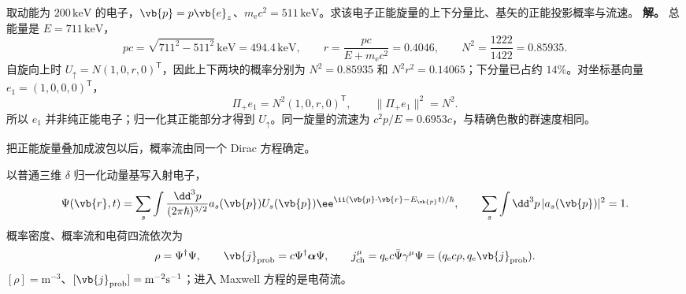 \begin{exbox}
取动能为 $200\,\mathrm{keV}$ 的电子，$\vb{p}=p\vb{e}_z$、$m_{\mathrm e}c^2=511\,\mathrm{keV}$。求该电子正能旋量的上下分量比、基矢的正能投影概率与流速。
\textbf{解。} 总能量是 $E=711\,\mathrm{keV}$，
\begin{equation*}
 pc=\sqrt{711^2-511^2}\,\mathrm{keV}=494.4\,\mathrm{keV},
 \qquad r=\frac{pc}{E+m_{\mathrm e}c^2}=0.4046,
 \qquad N^2=\frac{1222}{1422}=0.85935.
\end{equation*}
自旋向上时 $U_\uparrow=N(1,0,r,0)^{\mathsf T}$，因此上下两块的概率分别为 $N^2=0.85935$ 和 $N^2r^2=0.14065$；下分量已占约 $14\%$。对坐标基向量 $e_1=(1,0,0,0)^{\mathsf T}$，
\begin{equation*}
 \Pi_+e_1=N^2(1,0,r,0)^{\mathsf T},
 \qquad \|\Pi_+e_1\|^2=N^2.
\end{equation*}
所以 $e_1$ 并非纯正能电子；归一化其正能部分才得到 $U_\uparrow$。同一旋量的流速为 $c^2p/E=0.6953c$，与精确色散的群速度相同。
\end{exbox}

把正能旋量叠加成波包以后，概率流由同一个 Dirac 方程确定。
\label{sec:feqo-current-and-packet}
\begin{definition}[正能单电子波包与概率流]
以普通三维 $\delta$ 归一化动量基写入射电子，
\begin{equation}
 \Psi(\vb{r},t)=\sum_s\int\frac{\dd^3p}{(2\pi\hbar)^{3/2}}
 a_s(\vb{p})U_s(\vb{p})
 \ee^{\ii(\vb{p}\cdot\vb{r}-E_{\vb{p}}t)/\hbar},
 \qquad \sum_s\int\dd^3p\,|a_s(\vb{p})|^2=1.
 \label{eq:feqo-positive-wavepacket}
\end{equation}
概率密度、概率流和电荷四流依次为
\begin{equation}
 \rho=\Psi^\dagger\Psi,\qquad
 \vb{j}_{\rm prob}=c\Psi^\dagger\boldsymbol\alpha\Psi,\qquad
 j_{\rm ch}^\mu=q_{\mathrm e}c\bar\Psi\gamma^\mu\Psi
 =(q_{\mathrm e}c\rho,q_{\mathrm e}\vb{j}_{\rm prob}).
 \label{eq:feqo-dirac-current}
\end{equation}
$[\rho]=\mathrm{m^{-3}}$、$[\vb{j}_{\rm prob}]=\mathrm{m^{-2}s^{-1}}$；进入 Maxwell 方程的是电荷流。
\end{definition}

